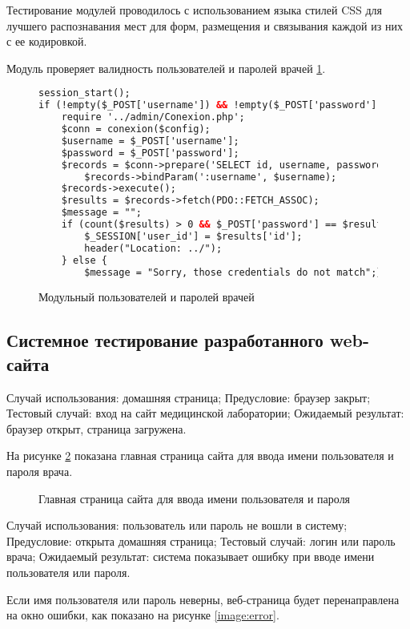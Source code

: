 Тестирование модулей проводилось с использованием языка стилей CSS для лучшего распознавания мест для форм, размещения и связывания каждой из них с ее кодировкой.

Модуль проверяет валидность пользователей и паролей врачей \ref{image:codus}.

\begin{figure}
\begin{lstlisting}[language=html]
session_start();
if (!empty($_POST['username']) && !empty($_POST['password'])) {
	require '../admin/Conexion.php';
	$conn = conexion($config);
	$username = $_POST['username'];
	$password = $_POST['password'];
	$records = $conn->prepare('SELECT id, username, password FROM doctors WHERE username = :username');
		$records->bindParam(':username', $username);
	$records->execute();
	$results = $records->fetch(PDO::FETCH_ASSOC);
	$message = "";
	if (count($results) > 0 && $_POST['password'] == $results['password']) {
		$_SESSION['user_id'] = $results['id'];
		header("Location: ../");
	} else {
		$message = "Sorry, those credentials do not match";}}?>
\end{lstlisting}

\caption{Модульный пользователей и паролей врачей}
\label{image:codus}
\end{figure}

\subsection{Системное тестирование разработанного web-сайта}

Случай использования: домашняя страница;
Предусловие: браузер закрыт;
Тестовый случай: вход на сайт медицинской лаборатории;
Ожидаемый результат: браузер открыт, страница загружена.

На рисунке \ref{image:log} показана главная страница сайта для ввода имени пользователя и пароля врача.

\begin{figure}
\caption{Главная страница сайта для ввода имени пользователя и пароля}
\label{image:log}
\end{figure}

Случай использования: пользователь или пароль не вошли в систему;
Предусловие: открыта домашняя страница;
Тестовый случай: логин или пароль врача;
Ожидаемый результат: система показывает ошибку при вводе имени пользователя или пароля.

Если имя пользователя или пароль неверны, веб-страница будет перенаправлена на окно ошибки, как показано на рисунке \ref{image:error}.

